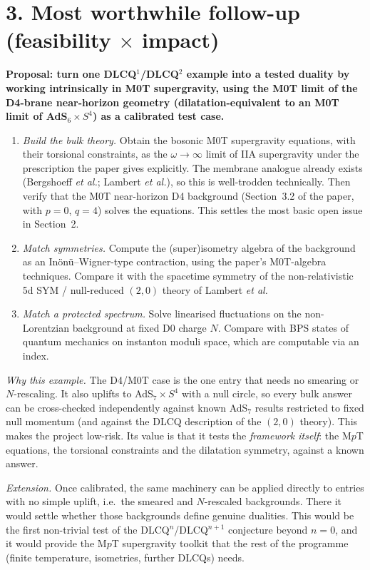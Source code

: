 \documentclass[11pt]{article}
\begin{document}
\section*{3. Most worthwhile follow-up (feasibility $\times$ impact)}

\textbf{Proposal: turn one DLCQ$^1$/DLCQ$^2$ example into a tested duality by working intrinsically in M0T supergravity, using the M0T limit of the D4-brane near-horizon geometry (dilatation-equivalent to an M0T limit of AdS$_6\times S^4$) as a calibrated test case.}

\begin{enumerate}[label=(\alph*)]
  \item \emph{Build the bulk theory.} Obtain the bosonic M0T supergravity equations, with their torsional constraints, as the $\omega\to\infty$ limit of IIA supergravity under the prescription the paper gives explicitly. The membrane analogue already exists (Bergshoeff \emph{et al.}; Lambert \emph{et al.}), so this is well-trodden technically. Then verify that the M0T near-horizon D4 background (Section~3.2 of the paper, with $p=0$, $q=4$) solves the equations. This settles the most basic open issue in Section~2.
  \item \emph{Match symmetries.} Compute the (super)isometry algebra of the background as an Inönü--Wigner-type contraction, using the paper's M0T-algebra techniques. Compare it with the spacetime symmetry of the non-relativistic 5d SYM / null-reduced $(2,0)$ theory of Lambert \emph{et al.}
  \item \emph{Match a protected spectrum.} Solve linearised fluctuations on the non-Lorentzian background at fixed D0 charge $N$. Compare with BPS states of quantum mechanics on instanton moduli space, which are computable via an index.
\end{enumerate}

\emph{Why this example.} The D4/M0T case is the one entry that needs no smearing or $N$-rescaling. It also uplifts to AdS$_7\times S^4$ with a null circle, so every bulk answer can be cross-checked independently against known AdS$_7$ results restricted to fixed null momentum (and against the DLCQ description of the $(2,0)$ theory). This makes the project low-risk. Its value is that it tests the \emph{framework itself}: the M$p$T equations, the torsional constraints and the dilatation symmetry, against a known answer.

\emph{Extension.} Once calibrated, the same machinery can be applied directly to entries with no simple uplift, i.e.\ the smeared and $N$-rescaled backgrounds. There it would settle whether those backgrounds define genuine dualities. This would be the first non-trivial test of the DLCQ$^n$/DLCQ$^{n+1}$ conjecture beyond $n=0$, and it would provide the M$p$T supergravity toolkit that the rest of the programme (finite temperature, isometries, further DLCQs) needs.
\end{document}

